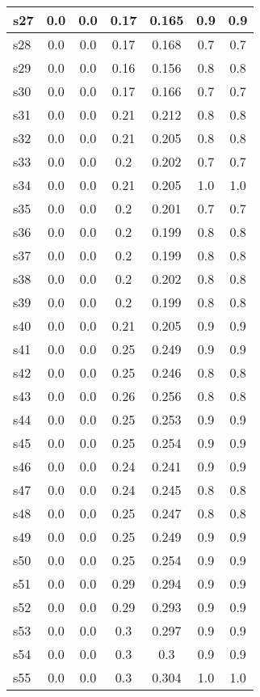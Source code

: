 \documentclass{article}
\begin{document}
\begin{tabular}{|l|c|c|c|c|c|c|}
s27 &0.0 & 0.0 & 0.17 & 0.165 & 0.9 & 0.9\\
\hline
s28 &0.0 & 0.0 & 0.17 & 0.168 & 0.7 & 0.7\\
\hline
s29 &0.0 & 0.0 & 0.16 & 0.156 & 0.8 & 0.8\\
\hline
s30 &0.0 & 0.0 & 0.17 & 0.166 & 0.7 & 0.7\\
\hline
s31 &0.0 & 0.0 & 0.21 & 0.212 & 0.8 & 0.8\\
\hline
s32 &0.0 & 0.0 & 0.21 & 0.205 & 0.8 & 0.8\\
\hline
s33 &0.0 & 0.0 & 0.2 & 0.202 & 0.7 & 0.7\\
\hline
s34 &0.0 & 0.0 & 0.21 & 0.205 & 1.0 & 1.0\\
\hline
s35 &0.0 & 0.0 & 0.2 & 0.201 & 0.7 & 0.7\\
\hline
s36 &0.0 & 0.0 & 0.2 & 0.199 & 0.8 & 0.8\\
\hline
s37 &0.0 & 0.0 & 0.2 & 0.199 & 0.8 & 0.8\\
\hline
s38 &0.0 & 0.0 & 0.2 & 0.202 & 0.8 & 0.8\\
\hline
s39 &0.0 & 0.0 & 0.2 & 0.199 & 0.8 & 0.8\\
\hline
s40 &0.0 & 0.0 & 0.21 & 0.205 & 0.9 & 0.9\\
\hline
s41 &0.0 & 0.0 & 0.25 & 0.249 & 0.9 & 0.9\\
\hline
s42 &0.0 & 0.0 & 0.25 & 0.246 & 0.8 & 0.8\\
\hline
s43 &0.0 & 0.0 & 0.26 & 0.256 & 0.8 & 0.8\\
\hline
s44 &0.0 & 0.0 & 0.25 & 0.253 & 0.9 & 0.9\\
\hline
s45 &0.0 & 0.0 & 0.25 & 0.254 & 0.9 & 0.9\\
\hline
s46 &0.0 & 0.0 & 0.24 & 0.241 & 0.9 & 0.9\\
\hline
s47 &0.0 & 0.0 & 0.24 & 0.245 & 0.8 & 0.8\\
\hline
s48 &0.0 & 0.0 & 0.25 & 0.247 & 0.8 & 0.8\\
\hline
s49 &0.0 & 0.0 & 0.25 & 0.249 & 0.9 & 0.9\\
\hline
s50 &0.0 & 0.0 & 0.25 & 0.254 & 0.9 & 0.9\\
\hline
s51 &0.0 & 0.0 & 0.29 & 0.294 & 0.9 & 0.9\\
\hline
s52 &0.0 & 0.0 & 0.29 & 0.293 & 0.9 & 0.9\\
\hline
s53 &0.0 & 0.0 & 0.3 & 0.297 & 0.9 & 0.9\\
\hline
s54 &0.0 & 0.0 & 0.3 & 0.3 & 0.9 & 0.9\\
\hline
s55 &0.0 & 0.0 & 0.3 & 0.304 & 1.0 & 1.0\\

\end{tabular}
\end{document}
